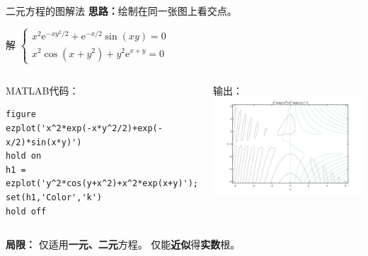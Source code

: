 \documentclass[12pt]{beamer}
\begin{document}
\begin{frame}[fragile]{二元方程的图解法}
		\textbf{思路：}绘制在同一张图上看交点。
	\begin{example}[6-2]解
		$\left\{\begin{array}{l}
		x^{2} \mathrm{e}^{-x y^{2} / 2}+\mathrm{e}^{-x / 2} \sin (x y)=0 \\
		x^{2} \cos \left(x+y^{2}\right)+y^{2} \mathrm{e}^{x+y}=0
		\end{array}\right.$
	
		\begin{columns}[T]
				\begin{block}{MATLAB代码：}
\begin{lstlisting}
figure
ezplot('x^2*exp(-x*y^2/2)+exp(-x/2)*sin(x*y)')
hold on
h1 = ezplot('y^2*cos(y+x^2)+x^2*exp(x+y)');
set(h1,'Color','k')
hold off
\end{lstlisting}
				\end{block}	  		
		
				\begin{block}{输出：}
					\centering
					\includegraphics[width=\textwidth]{12}
				\end{block}
		\end{columns}
	\end{example}

	\textbf{局限：}
仅适用\textbf{一元、二元}方程。
仅能\textbf{近似}得\textbf{实数}根。

\end{frame}
\end{document}

